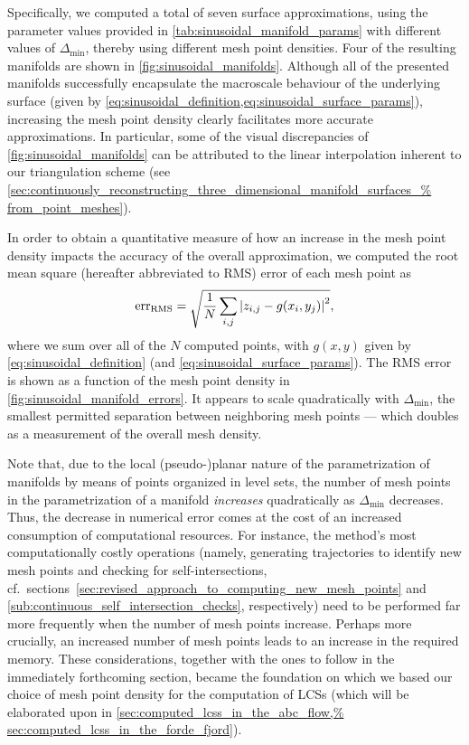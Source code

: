 Specifically, we computed a total of seven surface approximations, using
the parameter values provided in \cref{tab:sinusoidal_manifold_params} with
different values of $\Delta_{\min}$, thereby using different mesh point
densities. Four of the resulting manifolds are shown in
\cref{fig:sinusoidal_manifolds}. Although all of the presented manifolds
successfully encapsulate the macroscale behaviour of the underlying surface
(given by \cref{eq:sinusoidal_definition,eq:sinusoidal_surface_params}),
increasing the mesh point density clearly facilitates more accurate
approximations. In particular, some of the visual discrepancies of
\cref{fig:sinusoidal_manifolds} can be attributed to the linear interpolation
inherent to our triangulation scheme (see
\cref{sec:continuously_reconstructing_three_dimensional_manifold_surfaces_%
from_point_meshes}).





In order to obtain a quantitative measure of how an increase in the mesh
point density impacts the accuracy of the overall approximation, we
computed the root mean square (hereafter abbreviated to RMS) error of each mesh
point as
\begin{equation}
    \label{eq:sinusoidal_rms}
    \text{err}_{\text{RMS}} = \sqrt{\frac{1}{N}\sum\limits_{i,j}\abs{z_{i,j}-g(x_{i},y_{j})}^{2}},
\end{equation}
where we sum over all of the $N$ computed points, with $g(x,y)$ given
by \cref{eq:sinusoidal_definition} (and \cref{eq:sinusoidal_surface_params}).
The RMS error is shown as a function of the mesh point density in
\cref{fig:sinusoidal_manifold_errors}. It appears to scale quadratically
with $\Delta_{\min}$, the smallest permitted separation between neighboring
mesh points --- which doubles as a measurement of the overall mesh density.



Note that, due to the local (pseudo-)planar nature of the parametrization of
manifolds by means of points organized in level sets, the number of mesh points
in the parametrization of a manifold \emph{increases} quadratically as
$\Delta_{\min}$ decreases. Thus, the decrease in numerical error comes at the
cost of an increased consumption of computational resources. For instance,
the method's most computationally costly operations (namely, generating
trajectories to identify new mesh points and checking for self-intersections,
cf.\ sections~\ref{sec:revised_approach_to_computing_new_mesh_points} and
\ref{sub:continuous_self_intersection_checks}, respectively) need to be
performed far more frequently when the number of mesh points increase.
Perhaps more crucially, an increased number of mesh points leads to an
increase in the required memory. These considerations, together with the
ones to follow in the immediately forthcoming section, became the foundation
on which we based our choice of mesh point density for the computation of
LCSs (which will be elaborated upon in \cref{sec:computed_lcss_in_the_abc_flow,%
sec:computed_lcss_in_the_forde_fjord}).


